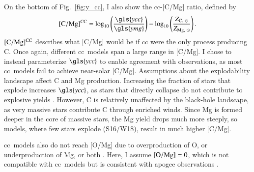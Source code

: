 \documentclass[12pt,oneside,letterpaper]{report}
\newcommand{\cc}{\gls{cc}}
\newcommand{\Cc}{\Gls{cc}}
\newcommand{\apogee}{\gls{apogee}}
\newcommand{\Ycc}{\gls{ycc}}
\newcommand{\Yoc}{\gls{ymg}}
\newcommand{\sun}{\odot}
\begin{document}
On the bottom of Fig.~\ref{fig:y_cc}, I also show the \cc{}-[C/Mg] ratio, defined by
\begin{equation}\label{eq:c_mg_cc}
    {\rm [C/Mg]^{CC}} = \log_{10}\left( \frac{\Ycc}{\Yoc}\right) - \log_{10} \left( \frac{Z_{{\rm C},\ \sun }}{Z_{{\rm Mg},\ \sun }} \right).
\end{equation}
${\rm [C/Mg]^{CC}}$ describes what [C/Mg] would be if \cc{} were the only process producing C.
Once again, different \cc\ models span a large range in [C/Mg]. 
I chose to instead parameterize $\Ycc$ to enable agreement with observations, as most \cc\ models fail to achieve near-solar [C/Mg].
Assumptions about the explodability landscape affect C and Mg production. Increasing the fraction of stars that explode increases $\Ycc$, as stars that directly collapse do not contribute to explosive yields \citep{emily+21}. However, C is relatively unaffected by the black-hole landscape, as very massive stars contribute C through enriched winds. Since Mg is formed deeper in the core of massive stars, the Mg yield drops much more steeply, so models, where few stars explode (S16/W18), result in much higher [C/Mg].

\Cc\ models also do not reach [O/Mg] due to overproduction of O, or underproduction of Mg, or both \citep{emily+21}. Here, I assume ${\rm [O/Mg]} = 0$, which is not compatible with \cc\ models but is consistent with \apogee{} observations \citep{weinberg+19, weinberg+22}.
    
\end{document}
